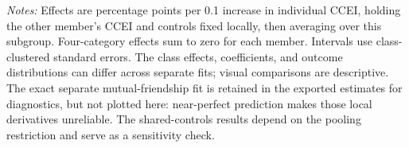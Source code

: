 \documentclass[11pt]{article}
\begin{document}
\footnotesize\textit{Notes:} Effects are percentage points per 0.1 increase in individual CCEI, holding the other member's CCEI and controls fixed locally, then averaging over this subgroup. Four-category effects sum to zero for each member. Intervals use class-clustered standard errors. The class effects, coefficients, and outcome distributions can differ across separate fits; visual comparisons are descriptive.
The exact separate mutual-friendship fit is retained in the exported estimates for diagnostics, but not plotted here: near-perfect prediction makes those local derivatives unreliable. The shared-controls results depend on the pooling restriction and serve as a sensitivity check.
\end{document}
